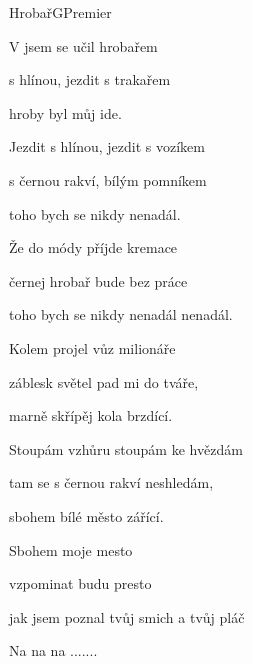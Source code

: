 \begin{song}{Hrobař}{G}{Premier}

\begin{SBVerse}

V  jsem se učil hrobařem

 s hlínou, jezdit s trakařem

 hroby byl můj ide.

\end{SBVerse}

\begin{SBVerse}

Jezdit s hlínou, jezdit s vozíkem

s černou rakví, bílým pomníkem

toho bych se nikdy nenadál.

\end{SBVerse}

\begin{SBVerse}

Že do módy příjde kremace

černej hrobař bude bez práce

toho bych se nikdy nenadál nenadál.

\end{SBVerse}

\begin{SBVerse}

Kolem projel vůz milionáře

záblesk světel pad mi do tváře,

marně skřípěj kola brzdící.

\end{SBVerse}

\begin{SBVerse}

Stoupám vzhůru stoupám ke hvězdám

tam se s černou rakví neshledám,

sbohem bílé město zářící.



Sbohem moje mesto

vzpominat budu presto

jak jsem poznal tvůj smich a tvůj pláč 

\end{SBVerse}

\begin{SBVerse}

Na na na .......

\end{SBVerse}

\end{song}
